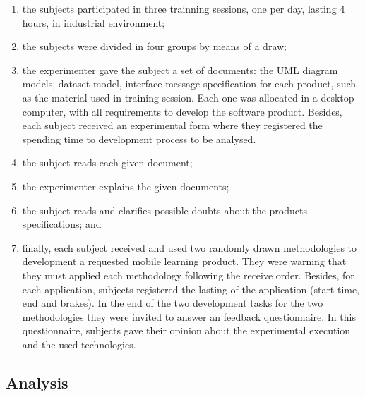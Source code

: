 \begin{enumerate}

\item the subjects participated in three trainning sessions, one per day, lasting 4 hours, in industrial environment;
\item the subjects were divided in four groups by means of a draw;
\item the experimenter gave the subject a set of documents: the UML diagram models, dataset model, interface message specification for each product, such as the material used in training session. Each one was allocated in a desktop computer, with all requirements to develop the software product. Besides, each subject received an experimental form where they registered the spending time to development process to be analysed.
\item the subject reads each given document;
\item the experimenter explains the given documents;
\item the subject reads and clarifies possible doubts about the products specifications; and
\item finally, each subject received and used two randomly drawn methodologies to development a requested mobile learning product. They were warning that they must applied each methodology following the receive order. Besides, for each application, subjects registered the lasting of the application (start time, end and brakes). In the end of the two development tasks for the two methodologies they were invited to answer an feedback questionnaire. In this questionnaire, subjects gave their opinion about the experimental execution and the used technologies.
\end{enumerate}









\subsection{Analysis}\label{sub:analysis}

